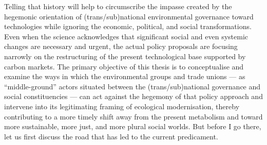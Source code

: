 \documentclass[a4paper, nobind]{templates/ociamthesis}
\begin{document}
Telling that history will help to circumscribe the impasse created by the hegemonic orientation of (trans/sub)national environmental governance toward technologies while ignoring the economic, political, and social transformations. Even when the science acknowledges that significant social and even systemic changes are necessary and urgent, the actual policy proposals are focusing narrowly on the restructuring of the present technological base supported by carbon markets. The primary objective of this thesis is to conceptualise and examine the ways in which the environmental groups and trade unions --- as ``middle-ground'' actors situated between the (trans/sub)national governance and social constituencies --- can act against the hegemony of that policy approach and intervene into its legitimating framing of ecological modernisation, thereby contributing to a more timely shift away from the present metabolism and toward more sustainable, more just, and more plural social worlds. But before I go there, let us first discuss the road that has led to the current predicament.
\end{document}
